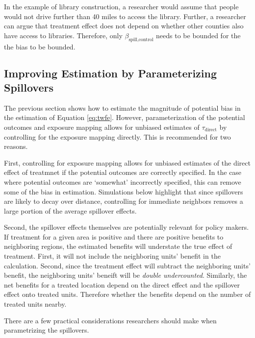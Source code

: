 \documentclass[11pt]{article}
\begin{document}
In the example of library construction, a researcher would assume that people would not drive further than 40 miles to access the library. Further, a researcher can argue that treatment effect does not depend on whether other counties also have access to libraries. Therefore, only $\beta_{\text{spill,control}}$ needs to be bounded for the the bias to be bounded. 


\subsection{Improving Estimation by Parameterizing Spillovers}

The previous section shows how to estimate the magnitude of potential bias in the estimation of Equation \ref{eq:twfe}. However, parameterization of the potential outcomes and exposure mapping allows for unbiased estimates of $\tau_{\text{direct}}$ by controlling for the exposure mapping directly. This is recommended for two reasons. 

First, controlling for exposure mapping allows for unbiased estimates of the direct effect of treatmnet if the potential outcomes are correctly specified. In the case where potential outcomes are `somewhat' incorrectly specified, this can remove some of the bias in estimation. Simulations below highlight that since spillovers are likely to decay over distance, controlling for immediate neighbors removes a large portion of the average spillover effects.

Second, the spillover effects themselves are potentially relevant for policy makers. If treatment for a given area is positive and there are positive benefits to neighboring regions, the estimated benefits will understate the true effect of treatment. First, it will not include the neighboring units' benefit in the calculation. Second, since the treatment effect will subtract the neighboring units' benefit, the neighboring units' beneift will be \emph{double undercounted}. Similarly, the net benefits for a treated location depend on the direct effect and the spillover effect onto treated units. Therefore whether the benefits depend on the number of treated units nearby.

There are a few practical considerations researchers should make when parametrizing the spillovers. %
\end{document}
